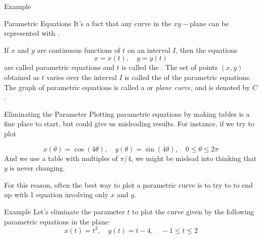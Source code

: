 \documentclass[presentation]{beamer}
\begin{document}
\begin{frame}[label={sec:org5c34e93}]{Example}
\end{frame}

\begin{frame}[label={sec:orge7a4b28}]{Parametric Equations}
It's a fact that any curve in the \(xy-\)plane can be represented
with \uline{\hspace*{1in}}.

\begin{definition}
If \(x\) and \(y\) are continuous functions of \(t\) on an interval
\(I\), then the equations
\[x = x \left( t \right), \quad y = y \left( t \right) \]
are called parametric equations and \(t\) is called the
\underline{\hspace{1in}}. The set of points \(\left( x,y \right)\)
obtained as \(t\) varies over the interval \(I\) is called the \underline{\hspace{1in}}
of the parametric equations.  The graph of parametric equations is
called a \underline{\hspace{1in}} or \emph{plane curve}, and is denoted by \(C\).
\end{definition}
\end{frame}

\begin{frame}[label={sec:org713bb88}]{Eliminating the Parameter}
Plotting parametric equations by making tables is a fine place to
start, but could give us misleading results.  For instance, if we try
to plot

\[
x \left( \theta \right) = \cos \left( 4\theta \right), \quad y \left(
\theta \right) = \sin \left( 4\theta \right), \quad 0 \le \theta \le 2\pi \]
And we use a table with multiples of \(\pi/4\), we might be mislead
into thinking that \(y\) is never changing.

For this reason, often the best way to plot a parametric curve is to
try to \uline{\hspace*{1in}} to end up with 1 equation involving
only \(x\) and \(y\).
\end{frame}

\begin{frame}[label={sec:org2fd592e}]{Example}
Let's eliminate the parameter \(t\) to plot the curve given by the
following parametric equations in the plane:
\[
x \left( t \right) = t^2, \quad y \left( t \right) = t - 4, \quad -1
\le t \le 2 \]
\vspace{10in}
\end{frame}
\end{document}
